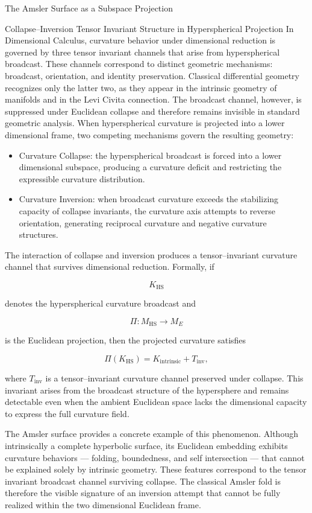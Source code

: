 \documentclass[final,onefignum,onetabnum]{siamart}
\begin{document}
\begin{section}{The Amsler Surface as a Subspace Projection}
\begin{subsection}{Collapse–Inversion Tensor Invariant Structure in Hyperspherical Projection}
In Dimensional Calculus, curvature behavior under dimensional reduction is governed by three tensor invariant channels that arise from hyperspherical broadcast. These channels correspond to distinct geometric mechanisms: broadcast, orientation, and identity preservation. Classical differential geometry recognizes only the latter two, as they appear in the intrinsic geometry of manifolds and in the Levi Civita connection. The broadcast channel, however, is suppressed under Euclidean collapse and therefore remains invisible in standard geometric analysis. When hyperspherical curvature is projected into a lower dimensional frame, two competing mechanisms govern the resulting geometry:

\begin{itemize}
    \item Curvature Collapse: the hyperspherical broadcast is forced into a lower dimensional subspace, producing a curvature deficit and restricting the expressible curvature distribution.
    \item Curvature Inversion: when broadcast curvature exceeds the stabilizing capacity of collapse invariants, the curvature axis attempts to reverse orientation, generating reciprocal curvature and negative curvature structures.
    \end{itemize}
    
The interaction of collapse and inversion produces a tensor--invariant curvature channel that survives dimensional reduction. Formally, if


\[
K_{\mathrm{HS}}
\]


denotes the hyperspherical curvature broadcast and


\[
\Pi : M_{\mathrm{HS}} \longrightarrow M_{E}
\]


is the Euclidean projection, then the projected curvature satisfies


\[
\Pi\!\left( K_{\mathrm{HS}} \right) = K_{\mathrm{intrinsic}} + T_{\mathrm{inv}},
\]


where $T_{\mathrm{inv}}$ is a tensor--invariant curvature channel preserved under collapse. This invariant arises from the broadcast structure of the hypersphere and remains detectable even when the ambient Euclidean space lacks the dimensional capacity to express the full curvature field.

The Amsler surface provides a concrete example of this phenomenon. Although intrinsically a complete hyperbolic surface, its Euclidean embedding exhibits curvature behaviors — folding, boundedness, and self intersection — that cannot be explained solely by intrinsic geometry. These features correspond to the tensor invariant broadcast channel surviving collapse. The classical Amsler fold is therefore the visible signature of an inversion attempt that cannot be fully realized within the two dimensional Euclidean frame.
\end{subsection}


\end{section}
\end{document}
